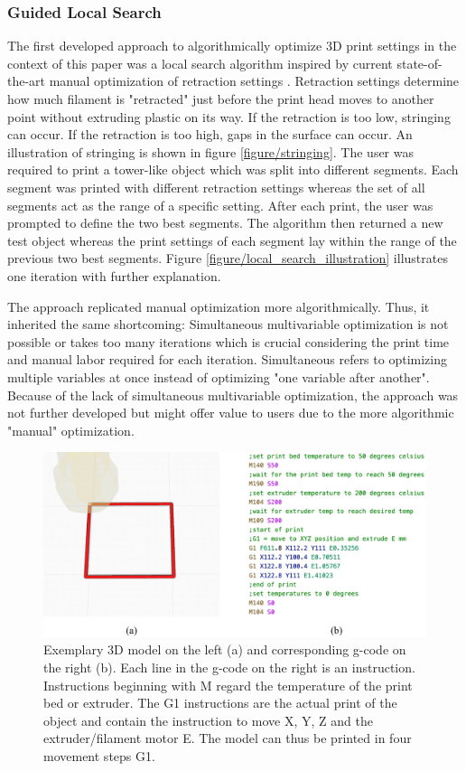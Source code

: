 \subsubsection{Guided Local Search}

The first developed approach to algorithmically optimize 3D print settings in the context of this paper was a local search algorithm inspired by current state-of-the-art manual optimization of retraction settings \cite{teachingTechCalibration}. Retraction settings determine how much filament is "retracted" just before the print head moves to another point without extruding plastic on its way. If the retraction is too low, stringing can occur. If the retraction is too high, gaps in the surface can occur. An illustration of stringing is shown in figure \ref{figure/stringing}. 
The user was required to print a tower-like object which was split into different segments. Each segment was printed with different retraction settings whereas the set of all segments act as the range of a specific setting. After each print, the user was prompted to define the two best segments. The algorithm then returned a new test object whereas the print settings of each segment lay within the range of the previous two best segments. Figure \ref{figure/local_search_illustration} illustrates one iteration with further explanation. 

The approach replicated manual optimization more algorithmically. Thus, it inherited the same shortcoming: Simultaneous multivariable optimization is not possible or takes too many iterations which is crucial considering the print time and manual labor required for each iteration. Simultaneous refers to optimizing multiple variables at once instead of optimizing "one variable after another". Because of the lack of simultaneous multivariable optimization, the approach was not further developed but might offer value to users due to the more algorithmic "manual" optimization. 

\begin{figure}[h]
    \centering
    \includegraphics[width=0.75\linewidth]{assets/model_gcode_example.jpg}
    \caption{Exemplary 3D model on the left (a) and corresponding g-code on the right (b). Each line in the g-code on the right is an instruction. Instructions beginning with M regard the temperature of the print bed or extruder. The G1 instructions are the actual print of the object and contain the instruction to move X, Y, Z and the extruder/filament motor E. The model can thus be printed in four movement steps G1.}
    \label{figure/gcode_example}
\end{figure}

